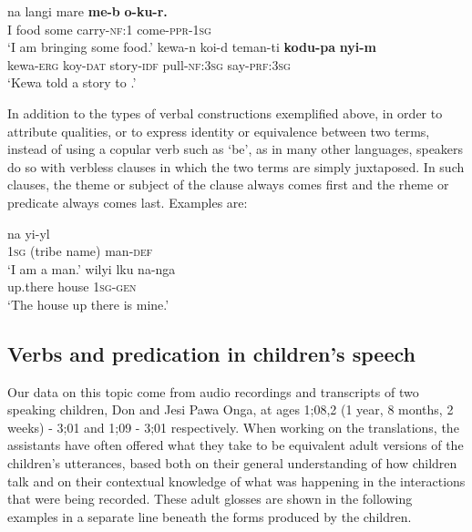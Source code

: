 \documentclass[output=paper]{langsci/langscibook}
\begin{document}
\begin{enumerate}
\ea
\ea   
\gll na     langi    mare      \textbf{me-b}        \textbf{o-ku-r.}\\
        I        food     some      carry-\textsc{nf}:1    come-\textsc{ppr}-\textsc{1sg}\\
       \glt `I am bringing some food.'
\ex
\gll kewa-n       koi-d       teman-ti   \textbf{kodu-pa}       \textbf{nyi-m}\\
        kewa-\textsc{erg}  koy-\textsc{dat}  story-\textsc{idf}  pull-\textsc{nf}:\textsc{3sg}    say-\textsc{prf}:\textsc{3sg}\\
\glt        `Kewa told a story to .'
\z
\z

In addition to the types of verbal constructions exemplified above, in order to attribute qualities, or to express identity or equivalence between two terms, instead of using a copular verb such as `be', as in many other languages,  speakers do so with verbless clauses in which the two terms are simply juxtaposed. In such clauses, the theme or subject of the clause always comes first and the rheme or predicate always comes last. Examples are: 

\ea
\ea
\gll na                 yi-yl            \\
          \textsc{1sg}    {(tribe name)}    man-\textsc{def}       \\
    \glt `I am a  man.'                     
\ex
\gll wilyi        lku        na-nga\\
          up.there    house    1\textsc{sg}-\textsc{gen}\\
\glt          `The house up there is mine.'
\z
\z
\end{enumerate}
\subsection{Verbs and predication in  children’s speech}

 Our data on this topic come from audio recordings and transcripts of two  speaking children,  Don and Jesi Pawa Onga, at ages 1;08,2 (1 year, 8 months, 2 weeks) - 3;01 and 1;09 - 3;01 respectively. When working on the translations, the assistants have often offered what they take to be equivalent adult  versions of the children’s utterances, based both on their general understanding of how  children talk and on their contextual knowledge of what was happening in the interactions that were being recorded. These adult  glosses are shown in the following examples in a separate line beneath the forms produced by the children.
\end{document}
